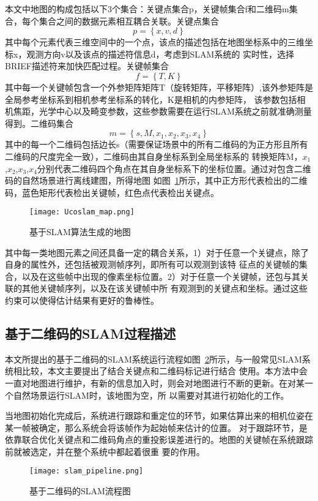 本文中地图的构成包括以下3个集合：关键点集合p，关键帧集合f和二维码m集合，每个集合之间的数据元素相互耦合关联。关键点集合
\begin{equation}p = \left\{x,v,d\right\}\end{equation}
其中每个元素代表三维空间中的一个点，该点的描述包括在地图坐标系中的三维坐标x，观测方向v以及该点的描述符信息d，考虑到SLAM系统的
实时性，选择BRIEF描述符来加快匹配过程。关键帧集合
\begin{equation}f = \left\{T,K\right\}\end{equation}
其中每一个关键帧包含一个外参矩阵矩阵T（旋转矩阵，平移矩阵）,该外参矩阵是全局参考坐标系到相机参考坐标系的转化，K是相机的内参矩阵，
该参数包括相机焦距，光学中心以及畸变参数，这些参数需要在运行SLAM系统之前就准确测量得到。二维码集合
\begin{equation}m = \left\{s,M,x_1,x_2,x_3,x_4\right\}\end{equation}
其中的每一个二维码包括边长s（需要保证场景中的所有二维码的为正方形且所有二维码的尺度完全一致），二维码由其自身坐标系到全局坐标系的
转换矩阵M，$x_1$,$x_2$,$x_3$,$x_4$分别代表二维码四个角点在其自身坐标系下的坐标位置。通过对包含二维码的自然场景进行离线建图，所得地图
如图~\ref{fig:Ucoslam_map}所示，其中正方形代表检出的二维码，蓝色矩形代表检出关键帧，红色点代表检出关键点。
\begin{figure}[H] %
  \centering
  \texttt{[image: Ucoslam\_map.png]}
  \caption{基于SLAM算法生成的地图}
  \label{fig:Ucoslam_map}
\end{figure}

其中每一类地图元素之间还具备一定的耦合关系，1）对于任意一个关键点，除了自身的属性外，还包括被观测帧序列，即所有可以观测到该特
征点的关键帧的集合，以及在这些帧中出现的像素坐标位置。2）对于任意一个关键帧，还包与其关联的其他关键帧序列，以及在该关键帧中所
有观测到的关键点和坐标。通过这些约束可以使得估计结果有更好的鲁棒性。

\subsection{基于二维码的SLAM过程描述}
\label{sec:2.3.3}
本文所提出的基于二维码的SLAM系统运行流程如图~\ref{fig:slam_pipeline}所示，与一般常见SLAM系统相比较，本文主要提出了结合关键点和二维码标记进行结合
使用。本方法中会一直对地图进行维护，有新的信息加入时，则会对地图进行不断的更新。在对某一个自然场景运行SLAM时，该地图为空，所
以需要对其进行初始化的工作。

当地图初始化完成后，系统进行跟踪和重定位的环节，如果估算出来的相机位姿在某一帧被确定，那么系统会将该帧作为起始帧来估计的位置。
对于跟踪环节，是依靠联合优化关键点和二维码角点的重投影误差进行的。地图的关键帧在系统跟踪前就被选定，并在整个系统中都起着很重
要的作用。
\begin{figure}[H] %
  \centering
  \texttt{[image: slam\_pipeline.png]}
  \caption{基于二维码的SLAM流程图}
  \label{fig:slam_pipeline}
\end{figure}

